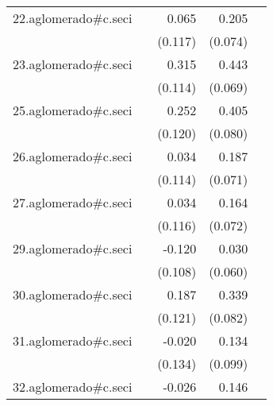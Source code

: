 {\begin{longtable}{l*{4}{D{.}{.}{-1}}}
\addlinespace
22.aglomerado#c.seci&                     &       0.065         &       0.205\sym{**} &                     \\
            &                     &     (0.117)         &     (0.074)         &                     \\
\addlinespace
23.aglomerado#c.seci&                     &       0.315\sym{**} &       0.443\sym{***}&                     \\
            &                     &     (0.114)         &     (0.069)         &                     \\
\addlinespace
25.aglomerado#c.seci&                     &       0.252\sym{*}  &       0.405\sym{***}&                     \\
            &                     &     (0.120)         &     (0.080)         &                     \\
\addlinespace
26.aglomerado#c.seci&                     &       0.034         &       0.187\sym{**} &                     \\
            &                     &     (0.114)         &     (0.071)         &                     \\
\addlinespace
27.aglomerado#c.seci&                     &       0.034         &       0.164\sym{*}  &                     \\
            &                     &     (0.116)         &     (0.072)         &                     \\
\addlinespace
29.aglomerado#c.seci&                     &      -0.120         &       0.030         &                     \\
            &                     &     (0.108)         &     (0.060)         &                     \\
\addlinespace
30.aglomerado#c.seci&                     &       0.187         &       0.339\sym{***}&                     \\
            &                     &     (0.121)         &     (0.082)         &                     \\
\addlinespace
31.aglomerado#c.seci&                     &      -0.020         &       0.134         &                     \\
            &                     &     (0.134)         &     (0.099)         &                     \\
\addlinespace
32.aglomerado#c.seci&                     &      -0.026         &       0.146         &                     \\

\end{longtable}}
